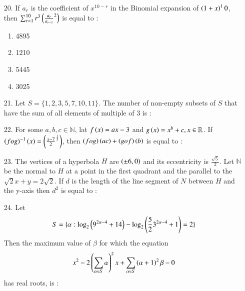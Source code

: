 \documentclass[journal,12pt,onecolumn]{IEEEtran}
\theoremstyle{remark}
\begin{document}
\begin{enumerate}
    \item[20.] If $a_r$ is the coefficient of $x^{10-r}$ in the Binomial expansion of
        $\left(1 + x\right)^10$, then $\sum_{r = 1} ^ {10} r^3\left(\frac{a_r}{a_{r-1}}^2\right)$ is equal to :
        \hfill{}
        \begin{multicols}{4}
            \begin{enumerate}
                \item 4895 \columnbreak
                \item 1210 \columnbreak 
                \item 5445 \columnbreak  
                \item 3025
            \end{enumerate}
        \end{multicols}
    \item[21.] Let $S = \{ 1, 2, 3, 5, 7, 10, 11\}$. The number of non-empty subsets of $S$
        that have the sum of all elements of multiple of 3 is :
        \hfill{}\\

    \item[22.] For some $a, b, c \in \mathbb{N}$, lat $f\left(x\right) = ax - 3$  and 
        $g\left(x\right) = x^b + c, x \in \mathbb{R}$. If 
        $\left(fog\right)^{-1}\left(x\right) = \left(\frac{x - 7}{2}^{\frac{1}{3}}\right)$,
        then $\left(fog\right)\left(ac\right) + \left(gof\right)\left(b\right)$ is equal to :
        \hfill{}\\



    \item[23.] The vertices of a hyperbola $H$ are $\left(\pm 6, 0\right)$ and its eccentricity is 
        $\frac{\sqrt{5}}{2}$. Let $\mathbb{N}$ be the normal to $H$ at a point in the first quadrant
        and the parallel to the $\sqrt{2}x + y = 2\sqrt{2}$. If $d$ is the length of the line
        segment of $N$ between $H$ and the y-axis then $d^2$ is equal to :
        \hfill{}\\

    \item[24.] Let 
        \begin{align}
            S = \{ \alpha : \log_2 \left(9^{2\alpha - 4} + 14\right) - \log_2 \left(\frac{5}{2}3^{2\alpha - 4} +1\right) = 2\}
        \end{align} Then the maximum value of $\beta$ for which the equation 
        \begin{align}
            x^2 -2\left(\sum_{\alpha \in S} \alpha\right)^2 x + \sum_{\alpha \in S} \left(\alpha + 1\right)^2 \beta - 0 
        \end{align} has real roots, is :
        \hfill{}\\



\end{enumerate}
\end{document}
